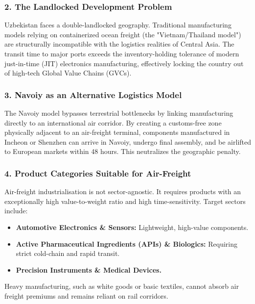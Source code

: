 \documentclass[11pt,a4paper]{article}
\begin{document}
\subsubsection*{2. The Landlocked Development Problem}
Uzbekistan faces a double-landlocked geography. Traditional manufacturing models relying on containerized ocean freight (the "Vietnam/Thailand model") are structurally incompatible with the logistics realities of Central Asia. The transit time to major ports exceeds the inventory-holding tolerance of modern just-in-time (JIT) electronics manufacturing, effectively locking the country out of high-tech Global Value Chains (GVCs).

\subsubsection*{3. Navoiy as an Alternative Logistics Model}
The Navoiy model bypasses terrestrial bottlenecks by linking manufacturing directly to an international air corridor. By creating a customs-free zone physically adjacent to an air-freight terminal, components manufactured in Incheon or Shenzhen can arrive in Navoiy, undergo final assembly, and be airlifted to European markets within 48 hours. This neutralizes the geographic penalty.

\subsubsection*{4. Product Categories Suitable for Air-Freight}
Air-freight industrialisation is not sector-agnostic. It requires products with an exceptionally high value-to-weight ratio and high time-sensitivity. Target sectors include:
\begin{itemize}
    \item \textbf{Automotive Electronics \& Sensors:} Lightweight, high-value components.
    \item \textbf{Active Pharmaceutical Ingredients (APIs) \& Biologics:} Requiring strict cold-chain and rapid transit.
    \item \textbf{Precision Instruments \& Medical Devices.}
\end{itemize}
Heavy manufacturing, such as white goods or basic textiles, cannot absorb air freight premiums and remains reliant on rail corridors.
\end{document}
